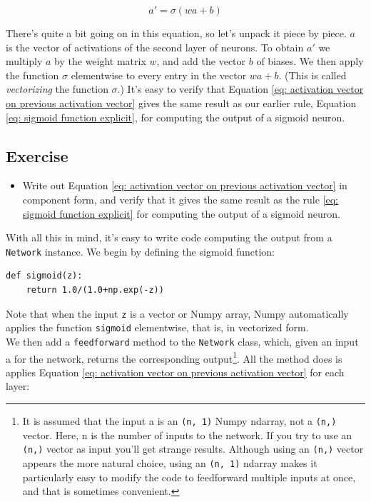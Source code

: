 \begin{equation}
a'=\sigma(wa+b)
\label{eq: activation vector on previous activation vector}
\end{equation}

There's quite a bit going on in this equation, so let's unpack it piece by piece. $a$ is the vector of activations of the second layer of neurons. To obtain $a'$ we multiply $a$ by the weight matrix $w$, and add the vector $b$ of biases. We then apply the function $\sigma$ elementwise to every entry in the vector $wa+b$. (This is called \textit{vectorizing} the function $\sigma$.) It's easy to verify that Equation \ref{eq: activation vector on previous activation vector} gives the same result as our earlier rule, Equation \ref{eq: sigmoid function explicit}, for computing the output of a sigmoid neuron.

\subsection*{Exercise}
\label{subs: exercise sigmoid function with vector}

\begin{itemize}
\item Write out Equation \ref{eq: activation vector on previous activation vector} in component form, and verify that it gives the same result as the rule \ref{eq: sigmoid function explicit} for computing the output of a sigmoid neuron.
\end{itemize}

With all this in mind, it's easy to write code computing the output from a \texttt{Network} instance. We begin by defining the sigmoid function:

\begin{lstlisting}
def sigmoid(z):
    return 1.0/(1.0+np.exp(-z))
\end{lstlisting}

Note that when the input \texttt{z} is a vector or Numpy array, Numpy automatically applies the function \texttt{sigmoid} elementwise, that is, in vectorized form.\\

We then add a \texttt{feedforward} method to the \texttt{Network} class, which, given an input a for the network, returns the corresponding output\footnote{It is assumed that the input a is an \texttt{(n, 1)} Numpy ndarray, not a \texttt{(n,)} vector. Here, n is the number of inputs to the network. If you try to use an \texttt{(n,)} vector as input you'll get strange results. Although using an \texttt{(n,)} vector appears the more natural choice, using an \texttt{(n, 1)} ndarray makes it particularly easy to modify the code to feedforward multiple inputs at once, and that is sometimes convenient.}. All the method does is applies Equation \ref{eq: activation vector on previous activation vector} for each layer:

